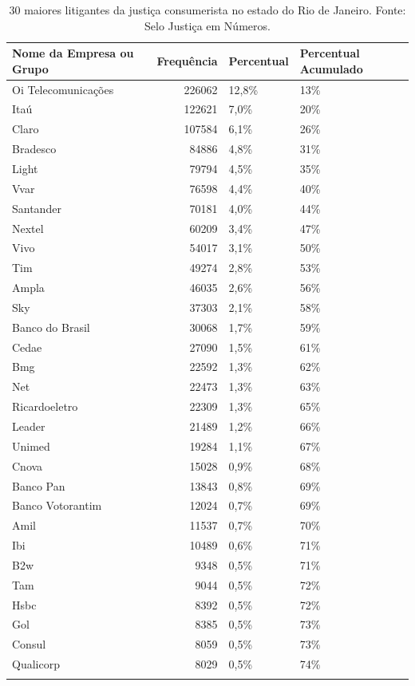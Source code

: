 \documentclass[]{report}
\begin{document}
\begin{longtable}{lrll}
\caption{30 maiores litigantes da justiça consumerista no estado do Rio de Janeiro. Fonte: Selo Justiça em Números.} \\
  \hline
Nome da Empresa ou Grupo & Frequência & Percentual & Percentual Acumulado \\
  \hline
Oi
Telecomunicações & 226062 & 12,8\% & 13\% \\
  Itaú & 122621 & 7,0\% & 20\% \\
  Claro & 107584 & 6,1\% & 26\% \\
  Bradesco & 84886 & 4,8\% & 31\% \\
  Light & 79794 & 4,5\% & 35\% \\
  Vvar & 76598 & 4,4\% & 40\% \\
  Santander & 70181 & 4,0\% & 44\% \\
  Nextel & 60209 & 3,4\% & 47\% \\
  Vivo & 54017 & 3,1\% & 50\% \\
  Tim & 49274 & 2,8\% & 53\% \\
  Ampla & 46035 & 2,6\% & 56\% \\
  Sky & 37303 & 2,1\% & 58\% \\
  Banco do Brasil & 30068 & 1,7\% & 59\% \\
  Cedae & 27090 & 1,5\% & 61\% \\
  Bmg & 22592 & 1,3\% & 62\% \\
  Net & 22473 & 1,3\% & 63\% \\
  Ricardoeletro & 22309 & 1,3\% & 65\% \\
  Leader & 21489 & 1,2\% & 66\% \\
  Unimed & 19284 & 1,1\% & 67\% \\
  Cnova & 15028 & 0,9\% & 68\% \\
  Banco Pan & 13843 & 0,8\% & 69\% \\
  Banco
Votorantim & 12024 & 0,7\% & 69\% \\
  Amil & 11537 & 0,7\% & 70\% \\
  Ibi & 10489 & 0,6\% & 71\% \\
  B2w & 9348 & 0,5\% & 71\% \\
  Tam & 9044 & 0,5\% & 72\% \\
  Hsbc & 8392 & 0,5\% & 72\% \\
  Gol & 8385 & 0,5\% & 73\% \\
  Consul & 8059 & 0,5\% & 73\% \\
  Qualicorp & 8029 & 0,5\% & 74\% \\
   \hline
\hline
\label{unnamed-chunk-19}
\end{longtable}
\end{document}
